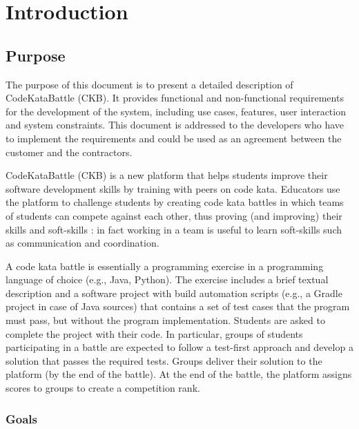 \chapter{Introduction}

\section{Purpose}
The purpose of this document is to present a detailed description of CodeKataBattle (CKB).
It provides functional and non-functional requirements for the development of the system, including use cases, features, user interaction and system constraints. This document is addressed to the developers who have to implement the requirements and
could be used as an agreement between the customer and the contractors.

CodeKataBattle (CKB) is a new platform that helps students improve their software development skills by training with peers on code kata. Educators use the platform to challenge students by creating code
kata battles in which teams of students can compete against each other, thus proving (and improving) their skills and soft-skills : in fact working in a team is useful to learn soft-skills such as
communication and coordination.

A code kata battle is essentially a programming exercise in a programming language of choice (e.g.,
Java, Python). The exercise includes a brief textual description and a software project with build
automation scripts (e.g., a Gradle project in case of Java sources) that contains a set of test cases that
the program must pass, but without the program implementation. Students are asked to complete the
project with their code. In particular, groups of students participating in a battle are expected to follow
a test-first approach and develop a solution that passes the required tests. Groups deliver their
solution to the platform (by the end of the battle). At the end of the battle, the platform assigns scores
to groups to create a competition rank.

\subsection{Goals}

